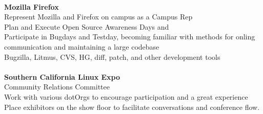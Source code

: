 \documentclass{res}
\begin{document}
\begin{resume}
\begin{tabbing}
\\

    {\bf Mozilla Firefox} \\
   \vspace{8pt}
	 Represent Mozilla and Firefox on campus as a Campus Rep \\
	 Plan and Execute Open Source Awareness Days and \\
	 Participate in Bugdays and Testday, becoming familiar with methods for onling communication and maintaining a large codebase\\
	 Bugzilla, Litmus, CVS, HG, diff, patch, and other development tools\\

\\

    {\bf Southern California Linux Expo} \\
   \vspace{8pt}
	 Community Relations Committee\\
	 Work with various dotOrgs to encourage participation and a great experience\\
	 Place exhibitors on the show floor to facilitate conversations and conference flow.\\
	 \end{tabbing}

\end{resume}
\end{document}

